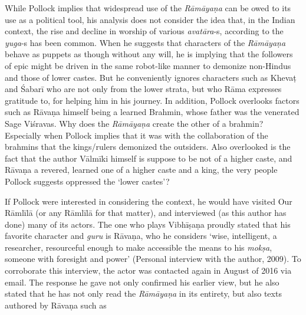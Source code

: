 While Pollock implies that widespread use of the \textit{Rāmāyaṇa} can be owed to its use as a political tool, his analysis does not consider the idea that, in the Indian context, the rise and decline in worship of various \textit{avatāra}-s, according to the \textit{yuga}-s has been common. When he suggests that characters of the \textit{Rāmāyaṇa} behave as puppets as though without any will, he is implying that the followers of epic might be driven in the same robot-like manner to demonize non-Hindus and those of lower castes. But he conveniently ignores characters such as Khevaṭ and Śabarī who are not only from the lower strata, but who Rāma expresses gratitude to, for helping him in his journey. In addition, Pollock overlooks factors such as Rāvaṇa himself being a learned Brahmin, whose father was the venerated Sage Viśravas. Why does the \textit{Rāmāyaṇa} create the other of a brahmin? Especially when Pollock implies that it was with the collaboration of the brahmins that the kings/rulers demonized the outsiders. Also overlooked is the fact that the author Vālmīki himself is suppose to be not of a higher caste, and Rāvaṇa a revered, learned one of a higher caste and a king, the very people Pollock suggests oppressed the ‘lower castes’?

If Pollock were interested in considering the context, he would have visited Our Rāmlīlā (or any Rāmlīlā for that matter), and interviewed (as this author has done) many of its actors. The one who plays Vibhīṣaṇa proudly stated that his favorite character and \textit{guru} is Rāvaṇa, who he considers ‘wise, intelligent, a researcher, resourceful enough to make accessible the means to his \textit{mokṣa}, someone with foresight and power’ (Personal interview with the author, 2009). To corroborate this interview, the actor was contacted again in August of 2016 via email. The response he gave not only confirmed his earlier view, but he also stated that he has not only read the \textit{Rāmāyaṇa} in its entirety, but also texts authored by Rāvaṇa such as

